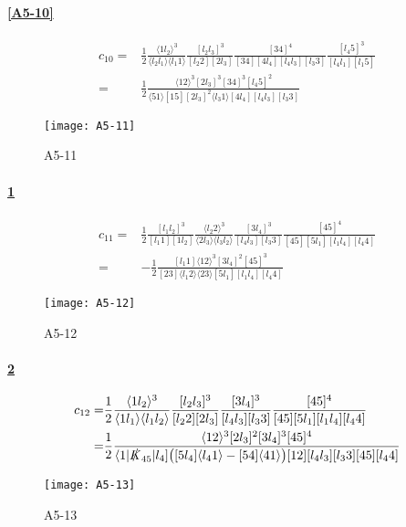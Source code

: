 \paragraph{\ref{A5-10}}
\begin{equation*}
\begin{split}
c_{10} = &
\frac{1}{2}\frac{\langle 1l_2\rangle^3}{\langle l_2 l_1 \rangle\langle l_1 1 \rangle}
\frac{[l_2 l_3]^3}{[l_2 2 ][2 l_3]}
\frac{[34]^4}{[34][4 l_4][l_4 l_3][l_3 3]}
\frac{[l_4 5]^3}{[l_4 l_1][l_1 5]}
\\
= &
\frac{1}{2}\frac{\langle 12 \rangle^3[2l_3]^3[34]^3[l_4 5 ]^2}{\langle 51 \rangle[15][2l_3]^2\langle l_3 1\rangle [4 l_4][l_4 l_3][l_3 3]}
\end{split}
\end{equation*}
%
%
\begin{figure}
  \centering
    \texttt{[image: A5-11]}
    \caption{A5-11}
  \label{A5-11}
\end{figure}
\paragraph{\ref{A5-11}}
\begin{equation*}
\begin{split}
c_{11} = &
\frac{1}{2}\frac{[l_1 l_2]^3}{[l_1 1][1l_2]}
\frac{\langle l_2 2 \rangle^3}{\langle 2 l_3 \rangle\langle l_3 l_2 \rangle}
\frac{[3l_4]^3}{[l_4 l_3][l_3 3]}
\frac{[45]^4}{[45][5l_1][l_1l_4][l_4 4]}
\\
= &
-\frac{1}{2}
\frac{[l_1 1]\langle 12 \rangle^3[3l_4]^2[45]^3}{[23]\langle l_1 2 \rangle\langle 23 \rangle[5l_1][l_1l_4][l_4 4]}
\end{split}
\end{equation*}
%
%
\begin{figure}
  \centering
    \texttt{[image: A5-12]}
    \caption{A5-12}
  \label{A5-12}
\end{figure}
\paragraph{\ref{A5-12}}
\begin{equation*}
\begin{split}
c_{12} = &
\frac{1}{2}
\frac{\langle 1 l_2 \rangle^3}{\langle 1 l_1\rangle\langle l_1 l_2\rangle}
\frac{[l_2 l_3]^3}{[l_2 2 ][2l_3]}
\frac{[3l_4]^3}{[l_4 l_3][l_3 3]}
\frac{[45]^4}{[45][5l_1][l_1 l_4][l_4 4]}
\\
= &
\frac{1}{2}\frac{\langle 12 \rangle^3[2l_3]^2[3l_4]^3[45]^4}{\langle 1|\slashed{K}_{45}|l_4] \big([5l_4]\langle l_41\rangle - [54]\langle 41 \rangle\big) [12][l_4 l_3][l_3 3 ][45][l_4 4]}
\end{split}
\end{equation*}
%
%
\begin{figure}
  \centering
    \texttt{[image: A5-13]}
    \caption{A5-13}
  \label{A5-13}
\end{figure}
